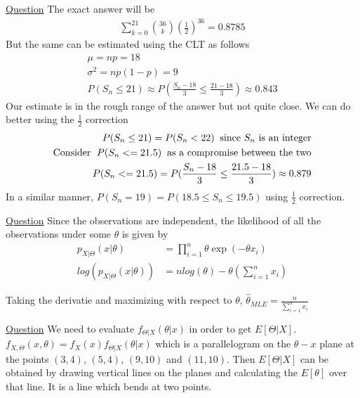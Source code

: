 \documentclass[../probability-notes.tex]{subfiles}
\begin{document}
\begin{enumerate}
        \hypertarget{a_binclt}{\item} \hyperlink{q_binclt}{Question}
        The exact answer will be
        \begin{align*}
            \sum_{k=0}^{21}\binom{36}{k}(\frac{1}{2})^{36} = 0.8785
        \end{align*}
        But the same can be estimated using the CLT as follows
        \begin{align*}
            \mu = np = 18\\
            \sigma^{2} = np(1-p) = 9\\
            P(S_{n} \leq 21) \approx P(\frac{S_{n} - 18}{3} \leq \frac{21-18}{3}) \approx 0.843
        \end{align*}
        Our estimate is in the rough range of the answer but not quite close. We can do better using the $\frac{1}{2}$ correction
        \begin{align*}
            P(S_{n} \leq 21) = P(S_{n} < 22) \text{\;\;since $S_{n}$ is an integer}\\
            \text{Consider \;}P(S_{n} <= 21.5) \text{\;\;as a compromise between the two}\\
            P(S_{n} <= 21.5) = P(\frac{S_{n} - 18}{3} \leq \frac{21.5 - 18}{3}) \approx 0.879
        \end{align*}
        In a similar manner, $P(S_{n}=19) = P(18.5 \leq S_{n} \leq 19.5)$ using $\frac{1}{2}$ correction.


        \hypertarget{a_mleestimate}{\item} \hyperlink{q_mleestimate}{Question}\newline
        Since the observations are independent, the likelihood of all the observations under some $\theta$ is given by
        \begin{align*}
            p_{X|\Theta}(x|\theta) &= \prod_{i=1}^{n} \theta \exp(-\theta x_{i})\\
            log(p_{X|\Theta}(x|\theta)) &= n log(\theta) - \theta(\sum_{i=1}^{n} x_{i})
        \end{align*}

        Taking the derivatie and maximizing with respect to $\theta$, $\hat{\theta}_{MLE} = \frac{n}{\sum_{i=1}^{n}x_{i}}$


        \hypertarget{a_lmsestimate}{\item} \hyperlink{q_lmsestimate}{Question}\newline
        We need to evaluate $f_{\Theta|X}(\theta|x)$ in order to get $E[\Theta|X]$.
        \newline
        $f_{X,\Theta}(x,\theta) = f_{X}(x) f_{\Theta|X}(\theta|x)$ which is a parallelogram on the $\theta-x$ plane at the points  $(3,4)$, $(5,4)$, $(9,10)$ and $(11,10)$. Then $E[\Theta|X]$ can be obtained by drawing vertical lines on the planes and calculating the $E[\theta]$ over that line. It is a line which bends at two points.


\end{enumerate}
\end{document}
